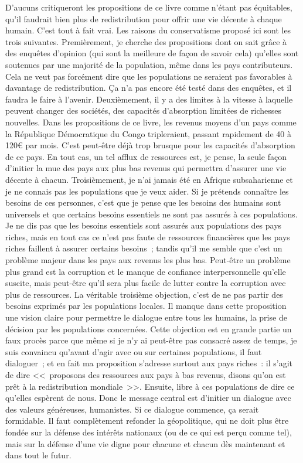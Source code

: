 \documentclass[a5paper,french]{memoir}
\begin{document}
D'aucuns critiqueront les propositions de ce livre comme n'étant pas équitables, qu'il faudrait bien plus de redistribution pour offrir une vie décente à chaque humain. C'est tout à fait vrai. Les raisons du conservatisme proposé ici sont les trois suivantes. Premièrement, je cherche des propositions dont on sait grâce à des enquêtes d'opinion (qui sont la meilleure de façon de savoir cela) qu'elles sont soutenues par une majorité de la population, même dans les pays contributeurs. Cela ne veut pas forcément dire que les populations ne seraient pas favorables à davantage de redistribution. Ça n'a pas encore été testé dans des enquêtes, et il faudra le faire à l'avenir. Deuxièmement, il y a des limites à la vitesse à laquelle peuvent changer des sociétés, des capacités d'absorption limitées de richesses nouvelles. Dans les propositions de ce livre, les revenus moyens d'un pays comme la République Démocratique du Congo tripleraient, passant rapidement de 40 à 120\euro{} par mois. C'est peut-être déjà trop brusque pour les capacités d'absorption de ce pays. En tout cas, un tel afflux de ressources est, je pense, la seule façon d'initier la mue des pays aux plus bas revenus qui permettra d'assurer une vie décente à chacun. Troisièmement, je n'ai jamais été en Afrique subsaharienne et je ne connais pas les populations que je veux aider. Si je prétends connaître les besoins de ces personnes, c'est que je pense que les besoins des humains sont universels et que certains besoins essentiels ne sont pas assurés à ces populations. Je ne dis pas que les besoins essentiels sont assurés aux populations des pays riches, mais en tout cas ce n'est pas faute de ressources financières que les pays riches faillent à assurer certains besoins~; tandis qu'il me semble que c'est un problème majeur dans les pays aux revenus les plus bas. Peut-être un problème plus grand est la corruption et le manque de confiance interpersonnelle qu'elle suscite, mais peut-être qu'il sera plus facile de lutter contre la corruption avec plus de ressources. La véritable troisième objection, c'est de ne pas partir des besoins exprimés par les populations locales. Il manque dans cette proposition une vision claire pour permettre le dialogue entre tous les humains, la prise de décision par les populations concernées. Cette objection est en grande partie un faux procès parce que même si je n'y ai peut-être pas consacré assez de temps, je suis convaincu qu'avant d'agir avec ou sur certaines populations, il faut dialoguer~; et en fait ma proposition s'adresse surtout aux pays riches~: il s'agit de dire <<~proposons des ressources aux pays à bas revenus, disons qu'on est prêt à la redistribution mondiale~>>. Ensuite, libre à ces populations de dire ce qu'elles espèrent de nous. Donc le message central est d'initier un dialogue avec des valeurs généreuses, humanistes. Si ce dialogue commence, ça serait formidable. Il faut complètement refonder la géopolitique, qui ne doit plus être fondée sur la défense des intérêts nationaux (ou de ce qui est perçu comme tel), mais sur la défense d'une vie digne pour chacune et chacun dès maintenant et dans tout le futur. 
\end{document}
